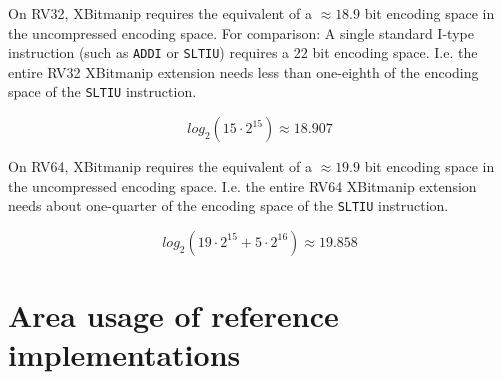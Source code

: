 On RV32, XBitmanip requires the equivalent of a $\approx 18.9$ bit encoding space in
the uncompressed encoding space. For comparison: A single standard I-type
instruction (such as \texttt{ADDI} or \texttt{SLTIU}) requires a $22$ bit
encoding space. I.e. the entire RV32 XBitmanip extension needs less than
one-eighth of the encoding space of the \texttt{SLTIU} instruction.

$$ log_2(15\cdot2^{15}) \approx 18.907 $$

On RV64, XBitmanip requires the equivalent of a $\approx 19.9$ bit encoding
space in the uncompressed encoding space. I.e. the entire RV64 XBitmanip
extension needs about one-quarter of the encoding space of the \texttt{SLTIU}
instruction.

$$ log_2(19\cdot2^{15} + 5\cdot2^{16}) \approx 19.858 $$

\section{Area usage of reference implementations}
\label{cores}

